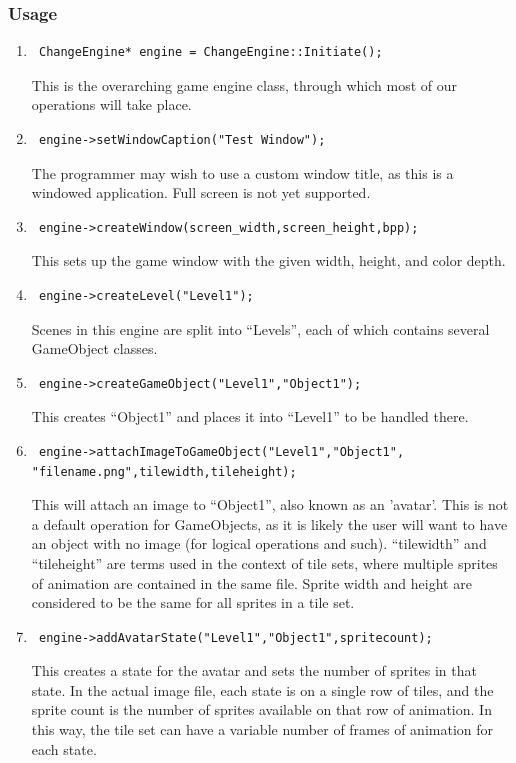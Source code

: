 \documentclass[12pt]{article}
\begin{document}
\subsubsection{Usage}
\begin{enumerate}
 \item \begin{verbatim} ChangeEngine* engine = ChangeEngine::Initiate(); \end{verbatim}
This is the overarching game engine class, through which most of our operations will take place.
 \item \begin{verbatim} engine->setWindowCaption("Test Window"); \end{verbatim}
The programmer may wish to use a custom window title, as this is a windowed application. Full screen is not yet supported.
 \item \begin{verbatim} engine->createWindow(screen_width,screen_height,bpp); \end{verbatim}
This sets up the game window with the given width, height, and color depth.
 \item \begin{verbatim} engine->createLevel("Level1"); \end{verbatim}
Scenes in this engine are split into ``Levels'', each of which contains several GameObject classes.
 \item \begin{verbatim} engine->createGameObject("Level1","Object1"); \end{verbatim}
This creates ``Object1'' and places it into ``Level1'' to be handled there.
 \item \begin{verbatim} engine->attachImageToGameObject("Level1","Object1",
"filename.png",tilewidth,tileheight); \end{verbatim}
This will attach an image to ``Object1'', also known as an 'avatar'. This is not a default operation for GameObjects, as it is likely the user will want to have an object with no image (for logical operations and such). ``tilewidth'' and ``tileheight'' are terms used in the context of tile sets, where multiple sprites of animation are contained in the same file. Sprite width and height are considered to be the same for all sprites in a tile set.
 \item \begin{verbatim} engine->addAvatarState("Level1","Object1",spritecount); \end{verbatim}
This creates a state for the avatar and sets the number of sprites in that state. In the actual image file, each state is on a single row of tiles, and the sprite count is the number of sprites available on that row of animation. In this way, the tile set can have a variable number of frames of animation for each state.


\end{enumerate}
\end{document}
